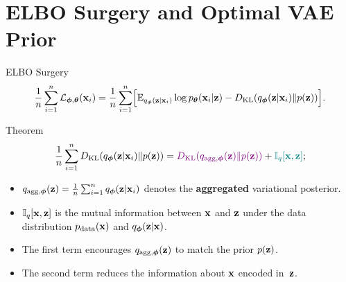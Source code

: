 \documentclass{beamer}
\renewcommand{\eqpause}{}
\begin{document}
\section{ELBO Surgery and Optimal VAE Prior}
\begin{frame}{ELBO Surgery}
	\vspace{-0.3cm}
	\[
	    \frac{1}{n} \sum_{i=1}^n \mathcal{L}_{\boldsymbol{\phi}, \boldsymbol{\theta}}(\mathbf{x}_i) = \frac{1}{n} \sum_{i=1}^n \Bigl[ \mathbb{E}_{q_{\boldsymbol{\phi}}(\mathbf{z}| \mathbf{x}_i)} \log p_{\boldsymbol{\theta}}(\mathbf{x}_i | \mathbf{z}) - D_\mathrm{KL}(q_{\boldsymbol{\phi}}(\mathbf{z}| \mathbf{x}_i) \| p(\mathbf{z})) \Bigr].
	\]
    \eqpause
	\vspace{-0.3cm}
	\begin{block}{Theorem}
		\vspace{-0.5cm}
		\[
		    \frac{1}{n} \sum_{i=1}^n D_\mathrm{KL}(q_{\boldsymbol{\phi}}(\mathbf{z}| \mathbf{x}_i) \| p(\mathbf{z})) = {\color{violet} D_\mathrm{KL}(q_{\text{agg}, \boldsymbol{\phi}}(\mathbf{z}) \| p(\mathbf{z}))} + {\color{teal}\mathbb{I}_{q} [\mathbf{x}, \mathbf{z}]};
		\]
        \eqpause
		\vspace{-0.5cm}
		\begin{itemize}
			\item $q_{\text{agg}, \boldsymbol{\phi}}(\mathbf{z}) = \frac{1}{n} \sum_{i=1}^n q_{\boldsymbol{\phi}}(\mathbf{z}| \mathbf{x}_i)$ denotes the \textbf{aggregated} variational posterior.
			\item $\mathbb{I}_{q} [\mathbf{x}, \mathbf{z}]$ is the mutual information between $\mathbf{x}$ and $\mathbf{z}$ under the data distribution $p_{\text{data}}(\mathbf{x})$ and $q_{\boldsymbol{\phi}}(\mathbf{z}| \mathbf{x})$.
			\item  {\color{violet} The first term} encourages $q_{\text{agg}, \boldsymbol{\phi}}(\mathbf{z})$ to match the prior $p(\mathbf{z})$.
			\item {\color{teal} The second term} reduces the information about $\mathbf{x}$ encoded in~$\mathbf{z}$.
		\end{itemize}
	\end{block}
\end{frame}
\end{document}
